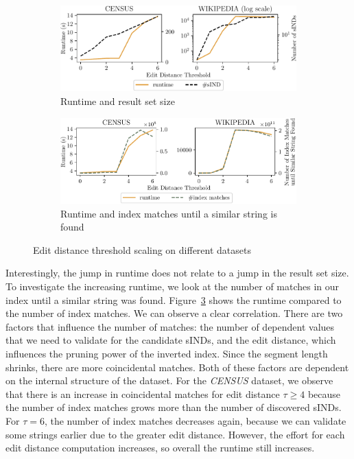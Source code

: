 \begin{figure}
    \centering
    \begin{subfigure}[b]{.8\textwidth}
        \centering
        \includegraphics[width=\textwidth]{figures/evaluation/ed_scaling-crop.pdf}
        \caption{Runtime and result set size}
        \label{fig:eval:ed}
    \end{subfigure}
    \begin{subfigure}[b]{.8\textwidth}
        \centering
        \includegraphics[width=\textwidth]{figures/evaluation/ed_scaling_explanation-crop.pdf}
        \caption{Runtime and index matches until a similar string is found}
        \label{fig:eval:ed_explanation}
    \end{subfigure}
    \caption{Edit distance threshold scaling on different datasets}
\end{figure}

Interestingly, the jump in runtime does not relate to a jump in the result set size.
To investigate the increasing runtime, we look at the number of matches in our index until a similar string was found.
Figure~\ref{fig:eval:ed_explanation} shows the runtime compared to the number of index matches.
We can observe a clear correlation.
There are two factors that influence the number of matches:
the number of dependent values that we need to validate for the candidate sINDs, and the edit distance, which influences the pruning power of the inverted index.
Since the segment length shrinks, there are more coincidental matches.
Both of these factors are dependent on the internal structure of the dataset.
For the \emph{CENSUS} dataset, we observe that there is an increase in coincidental matches for edit distance $\tau \geq 4$ because the number of index matches grows more than the number of discovered sINDs.
For $\tau = 6$, the number of index matches decreases again, because we can validate some strings earlier due to the greater edit distance.
However, the effort for each edit distance computation increases, so overall the runtime still increases.

